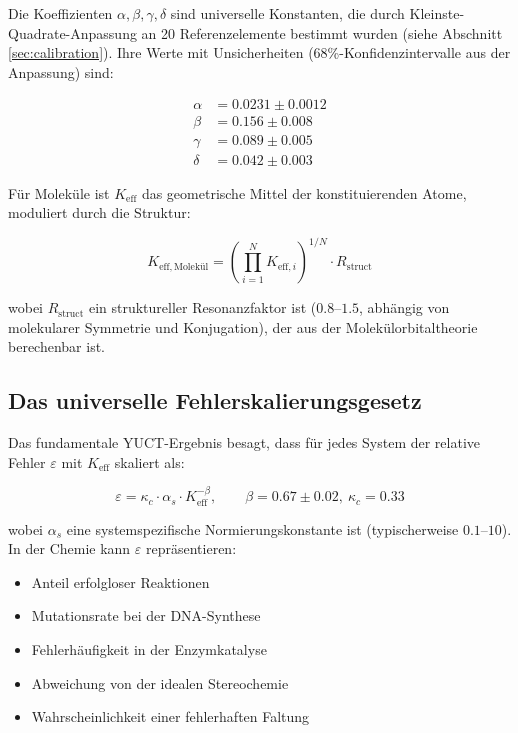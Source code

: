 \documentclass[12pt,a4paper]{article}
\newcommand{\Keff}{K_{\mathrm{eff}}}
\newcommand{\kappac}{\kappa_c}
\newcommand{\eps}{\varepsilon}
\newcommand{\Rstruct}{R_{\mathrm{struct}}}
\begin{document}
	Die Koeffizienten $\alpha, \beta, \gamma, \delta$ sind universelle Konstanten, die durch Kleinste-Quadrate-Anpassung an 20 Referenzelemente bestimmt wurden (siehe Abschnitt \ref{sec:calibration}). Ihre Werte mit Unsicherheiten (68\%-Konfidenzintervalle aus der Anpassung) sind:
	
	\begin{align}
		\alpha &= 0.0231 \pm 0.0012 \\
		\beta &= 0.156 \pm 0.008 \\
		\gamma &= 0.089 \pm 0.005 \\
		\delta &= 0.042 \pm 0.003
	\end{align}
	
	Für Moleküle ist $\Keff$ das geometrische Mittel der konstituierenden Atome, moduliert durch die Struktur:
	
	\begin{equation}
		K_{\mathrm{eff},\text{Molekül}} = \left(\prod_{i=1}^{N} K_{\mathrm{eff},i}\right)^{1/N} \cdot \Rstruct
		\label{eq:keff-molecule}
	\end{equation}
	
	wobei $\Rstruct$ ein struktureller Resonanzfaktor ist ($0.8$--$1.5$, abhängig von molekularer Symmetrie und Konjugation), der aus der Molekülorbitaltheorie berechenbar ist.
	
	\subsection{Das universelle Fehlerskalierungsgesetz}
	
	Das fundamentale YUCT-Ergebnis besagt, dass für jedes System der relative Fehler $\eps$ mit $\Keff$ skaliert als:
	
	\begin{equation}
		\boxed{\eps = \kappac \cdot \alpha_s \cdot \Keff^{-\beta}, \qquad \beta = 0.67 \pm 0.02, \ \kappac = 0.33}
		\label{eq:universal-error}
	\end{equation}
	
	wobei $\alpha_s$ eine systemspezifische Normierungskonstante ist (typischerweise $0.1$--$10$). In der Chemie kann $\eps$ repräsentieren:
	\begin{itemize}
		\item Anteil erfolgloser Reaktionen
		\item Mutationsrate bei der DNA-Synthese
		\item Fehlerhäufigkeit in der Enzymkatalyse
		\item Abweichung von der idealen Stereochemie
		\item Wahrscheinlichkeit einer fehlerhaften Faltung
	\end{itemize}
	
\end{document}
